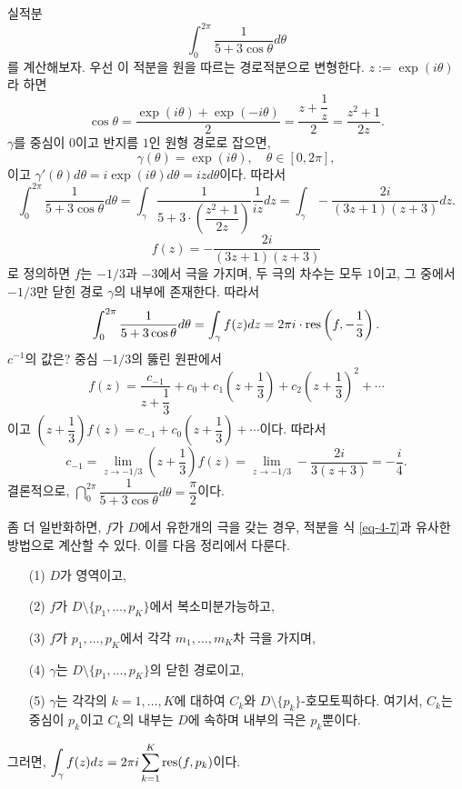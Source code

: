 \begin{saltexample}[label=example-4-18]{}{}
실적분
\[
\int_0^{2\pi} \dfrac1{5 + 3\cos\theta} d\theta
\]
를 계산해보자.
우선 이 적분을 원을 따르는 경로적분으로 변형한다.
$z:=\exp(i\theta)$라 하면
\[
\cos\theta = \dfrac{\exp(i\theta) + \exp(-i\theta)}2 
= \dfrac{z+ \dfrac1z}2 = \dfrac{z^2+1}{2z}.
\]
$\gamma$를 중심이 $0$이고 반지름 $1$인 원형 경로로 잡으면,
\[
\gamma(\theta) = \exp(i\theta), \quad \theta \in [0,2\pi],
\]
이고 $\gamma'(\theta) d\theta = i\exp(i\theta)d\theta = izd\theta$이다.
따라서
\[
\int_0^{2\pi} \dfrac1{5 + 3\cos\theta} d\theta
= \int_\gamma \dfrac1{5+3\cdot\left(\dfrac{z^2+1}{2z}\right)}
\dfrac1{iz}dz
= \int_\gamma - \dfrac{2i}{(3z+1)(z+3)}dz.
\]
\[
f(z) = - \dfrac{2i}{(3z+1)(z+3)}
\]
로 정의하면 $f$는 $-1/3$과 $-3$에서 극을 가지며,
두 극의 차수는 모두 $1$이고,
그 중에서 $-1/3$만 닫힌 경로 $\gamma$의 내부에 존재한다.
따라서
\[
\int_0^{2\pi} \displaystyle\frac1{5 + 3\cos\theta} d\theta
= \int_\gamma f(z)dz = 2\pi i \cdot \mathop{\mathrm{res}}\left(f, -\displaystyle\frac13\right).
\]
$c^{-1}$의 값은? 중심 $-1/3$의 뚫린 원판에서
\[
f(z) = \dfrac{c_{-1}}{z+ \dfrac13} + c_0 + c_1\left(z + \dfrac13\right)
+ c_2\left(z+\dfrac13\right)^2 + \cdots
\]
이고 $\left(z+\dfrac13\right) f(z) = c_{-1} + c_0\left(z + \dfrac13\right) + \cdots$이다.
따라서
\[
c_{-1} = \lim_{z\to -1/3} \left(z+\dfrac13\right) f(z)
= \lim_{z\to -1/3} - \dfrac{2i}{3(z+3)} = - \dfrac i4.
\]
결론적으로, $\dint_0^{2\pi} \dfrac1{5 + 3\cos\theta} d\theta = \dfrac\pi2$이다.
\end{saltexample}

좀 더 일반화하면, $f$가 $D$에서 유한개의 극을 갖는 경우,
적분을 식 \eqref{eq-4-7}과 유사한 방법으로 계산할 수 있다.
이를 다음 정리에서 다룬다.

\newpage %

\begin{salttheorem} [유수정리] {}{} \label{thm-4-11}
\begin{itemize}
\item[(1)] $D$가 영역이고,
\item[(2)] $f$가 $D\setminus \{p_1, \ldots, p_K\}$에서 복소미분가능하고,
\item[(3)] $f$가 $p_1, \ldots, p_K$에서 각각 $m_1, \ldots, m_K$차 극을 가지며,
\item[(4)] $\gamma$는 $D\setminus \{p_1, \ldots, p_K\}$의 닫힌 경로이고,
\item[(5)] $\gamma$는 각각의 $k=1,\ldots, K$에 대하여
$C_k$와 $D\setminus\{p_k\}$-호모토픽하다.
여기서, $C_k$는 중심이 $p_k$이고 $C_k$의 내부는 $D$에 속하며 
내부의 극은 $p_k$뿐이다.
\end{itemize}
그러면, $\displaystyle\int_\gamma f(z)dz = 2\pi i \sum\limits_{k=1}^K \mathop{\mathrm{res}}(f,p_k)$이다.
\end{salttheorem}

